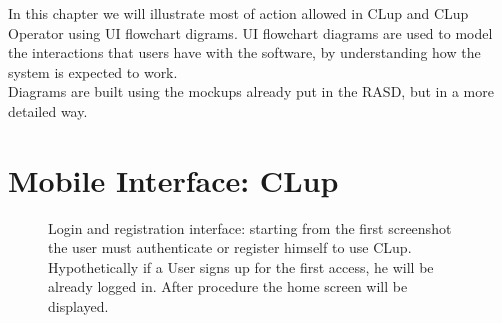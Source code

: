 In this chapter we will illustrate most of action allowed in CLup and CLup Operator using UI flowchart digrams. UI flowchart diagrams are used to model the interactions that users have with the software, by understanding how the system is expected to work. \\
Diagrams are built using the mockups already put in the RASD, but in a more detailed way.

\section{Mobile Interface: CLup}

\begin{figure}[H]
  \label{login_rec}
  \centering
    \caption{Login and registration interface: starting from the first screenshot the user must authenticate or register himself to use CLup. Hypothetically if a User signs up for the first access, he will be already logged in. After procedure the home screen will be displayed.}
\end{figure}



